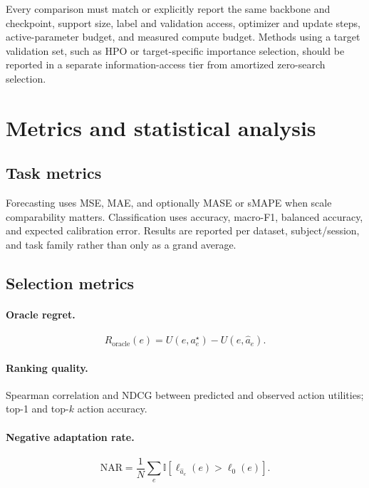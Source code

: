 \documentclass[10pt]{article}
\begin{document}
Every comparison must match or explicitly report the same backbone and checkpoint, support size, label and validation access, optimizer and update steps, active-parameter budget, and measured compute budget.
Methods using a target validation set, such as HPO or target-specific importance selection, should be reported in a separate information-access tier from amortized zero-search selection.

\section{Metrics and statistical analysis}

\subsection{Task metrics}

Forecasting uses MSE, MAE, and optionally MASE or sMAPE when scale comparability matters. Classification uses accuracy, macro-F1, balanced accuracy, and expected calibration error. Results are reported per dataset, subject/session, and task family rather than only as a grand average.

\subsection{Selection metrics}

\paragraph{Oracle regret.}
\begin{equation}
R_{\mathrm{oracle}}(e)=U(e,a_e^{\star})-U(e,\widehat a_e).
\end{equation}

\paragraph{Ranking quality.} Spearman correlation and NDCG between predicted and observed action utilities; top-1 and top-$k$ action accuracy.

\paragraph{Negative adaptation rate.}
\begin{equation}
\mathrm{NAR}=\frac{1}{N}\sum_e\mathbb{I}[\ell_{\widehat a_e}(e)>\ell_0(e)].
\end{equation}
\end{document}
